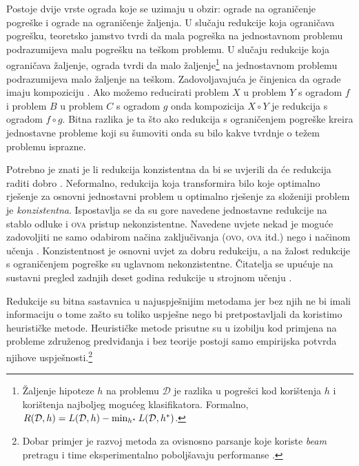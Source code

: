 Postoje dvije vrste ograda koje se uzimaju u obzir: ograde na ograničenje
pogreške i ograde na ograničenje žaljenja. U slučaju redukcije koja ograničava
pogrešku, teoretsko jamstvo tvrdi da mala pogreška na jednostavnom problemu
podrazumijeva malu pogrešku na teškom problemu. U slučaju redukcije koja
ograničava žaljenje, ograda tvrdi da malo žaljenje\footnote{Žaljenje hipoteze
$h$ na problemu $\mathcal{D}$ je razlika u pogrešci kod korištenja $h$ i
korištenja najboljeg mogućeg klasifikatora. Formalno, $R(\mathcal{D}, h) =
L(\mathcal{D}, h) - \min_{h\ssymbol{1}} L(\mathcal{D}, h\ssymbol{1})$.} na
jednostavnom problemu podrazumijeva malo žaljenje na teškom. Zadovoljavajuća je
činjenica da ograde imaju kompoziciju \citep{beygelzimer2005error}. Ako možemo
reducirati problem $X$ u problem $Y$ s ogradom $f$ i problem $B$ u problem $C$ s
ogradom $g$ onda kompozicija $X \circ Y$ je redukcija s ogradom $f \circ g$.
Bitna razlika je ta što ako redukcija s ograničenjem pogreške kreira jednostavne
probleme koji su šumoviti onda su bilo kakve tvrdnje o težem problemu isprazne.

Potrebno je znati je li redukcija konzistentna  da bi se
uvjerili da će redukcija raditi dobro \citep{beygelzimer2009error,
daume15reductions}. Neformalno, redukcija koja transformira bilo koje optimalno
rješenje za osnovni jednostavni problem u optimalno rješenje za složeniji
problem je \textit{konzistentna}. Ispostavlja se da su gore navedene jednostavne
redukcije na stablo odluke i \textsc{ova} pristup nekonzistentne. Navedene
uvjete nekad je moguće zadovoljiti ne samo odabirom načina zaključivanja
(\textsc{ovo}, \textsc{ova} itd.) nego i načinom učenja \citep{abe2004iterative,
beygelzimer2005weighted}. Konzistentnost je osnovni uvjet za dobru redukciju, a
na žalost redukcije s ograničenjem pogreške su uglavnom nekonzistentne.
Čitatelja se upućuje na sustavni pregled zadnjih deset godina redukcije u
strojnom učenju \citep{daume15reductions}.

Redukcije su bitna sastavnica u najuspješnijim \lts{} metodama jer bez njih ne
bi imali informaciju o tome zašto su toliko uspješne nego bi pretpostavljali da
koristimo heurističke metode. Heurističke metode prisutne su u izobilju kod
primjena na probleme združenog predviđanja i bez teorije postoji samo empirijska
potvrda njihove uspješnosti.\footnote{Dobar primjer je razvoj metoda za
ovisnosno parsanje koje koriste \textit{beam} pretragu i time eksperimentalno
poboljšavaju performanse \citep{zhang2011transition, bohnet2012transition}.}
